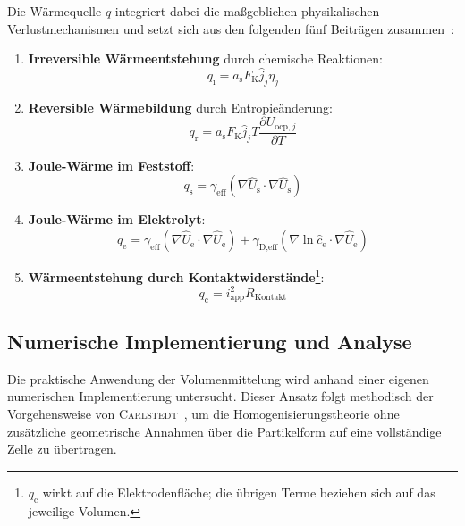 Die Wärmequelle $q$ integriert dabei die maßgeblichen physikalischen Verlustmechanismen und setzt sich aus den folgenden fünf Beiträgen zusammen~\cite{Plett2015}:

\begin{enumerate}
    \item \textbf{Irreversible Wärmeentstehung} durch chemische Reaktionen:
    \begin{equation}
        q_{\text{i}} = a_{\text{s}} F_{\text{K}} \hat{j}_j \eta_{j}
    \end{equation}
    \item \textbf{Reversible Wärmebildung} durch Entropieänderung:
    \begin{equation}
        q_{\text{r}} = a_{\text{s}} F_{\text{K}} \hat{j}_j T \frac{\partial U_{\text{ocp},j}}{\partial T}
    \end{equation}
    \item \textbf{Joule-Wärme im Feststoff}:
    \begin{equation}
        q_{\text{s}} = \gamma_{\text{eff}}(\nabla\hat{U}_{\text{s}} \cdot \nabla\hat{U}_{\text{s}})
    \end{equation}
    \item \textbf{Joule-Wärme im Elektrolyt}:
    \begin{equation}
        q_{\text{e}} = \gamma_{\text{eff}}(\nabla\hat{U}_{\text{e}} \cdot \nabla\hat{U}_{\text{e}}) + \gamma_{\text{D,eff}} (\nabla \ln \hat{c}_{\text{e}} \cdot \nabla \hat{U}_{\text{e}})
    \end{equation}
    \item \textbf{Wärmeentstehung durch Kontaktwiderstände}\footnote{$q_{\text{c}}$ wirkt auf die Elektrodenfläche; die übrigen Terme beziehen sich auf das jeweilige Volumen.}:
    \begin{equation}
        q_{\text{c}} = i_{\text{app}}^2 R_{\text{Kontakt}}
    \end{equation}
\end{enumerate}

\subsection{Numerische Implementierung und Analyse}

Die praktische Anwendung der Volumenmittelung wird anhand einer eigenen numerischen Implementierung untersucht. Dieser Ansatz folgt methodisch der Vorgehensweise von \textsc{Carlstedt}~\cite{Carlstedt2022b}, um die Homogenisierungstheorie ohne zusätzliche geometrische Annahmen über die Partikelform auf eine vollständige Zelle zu übertragen.

